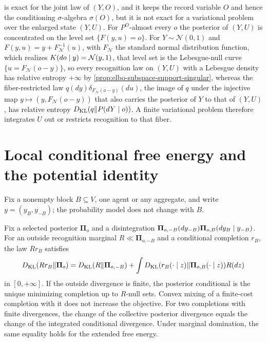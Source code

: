 is exact for the joint law of
$(Y,O)$, and it keeps the record variable $O$ and hence the conditioning
$\sigma$-algebra $\sigma(O)$, but it is not exact for a variational problem
over the enlarged state $(Y,U)$. For
$P^O$-almost every $o$ the posterior of $(Y,U)$ is concentrated on the level set
$\{F(y,u)=o\}$. For $Y\sim\mathcal N(0,1)$ and
$F(y,u)=y+F_{\mathcal N}^{-1}(u)$, with $F_{\mathcal N}$ the standard normal
distribution function, which realizes $K(do\mid y)=\mathcal N(y,1)$, that
level set is the Lebesgue-null curve $\{u=F_{\mathcal N}(o-y)\}$, so every
recognition law on $(Y,U)$ with a Lebesgue density has relative entropy
$+\infty$ by \cref{prop:elbo-subspace-support-singular}, whereas the
fiber-restricted law $q(dy)\delta_{F_{\mathcal N}(o-y)}(du)$, the image of $q$
under the injective map $y\mapsto(y,F_{\mathcal N}(o-y))$ that also carries the
posterior of $Y$ to that of $(Y,U)$, has relative entropy
$D_{\mathrm{KL}}(q\Vert P(dY\mid o))$. A finite variational problem therefore integrates
$U$ out or restricts recognition to that fiber. 

\section{Local conditional free energy and the potential identity}
\label{sec:local-conditional-vfe}

Fix a nonempty block $B\subseteq V$, one agent or any aggregate, and write
$y=(y_B,y_{-B})$; the probability model does not change with $B$.

Fix a selected posterior $\boldsymbol\Pi_o$ and a disintegration
$\boldsymbol\Pi_{o,-B}(dy_{-B})\boldsymbol\Pi_{o,B}(dy_B\mid y_{-B})$.
For an outside recognition marginal $R\ll\boldsymbol\Pi_{o,-B}$ and a
conditional completion $r_B$, the law $Rr_B$ satisfies
\begin{equation}
D_{\mathrm{KL}}(Rr_B\Vert\boldsymbol\Pi_o)
=D_{\mathrm{KL}}(R\Vert\boldsymbol\Pi_{o,-B})
+\int D_{\mathrm{KL}}(r_B(\cdot\mid z)\Vert\boldsymbol\Pi_{o,B}(\cdot\mid z))R(dz)
\label{eq:elbo-measure-block-descent}
\end{equation}
in $[0,+\infty]$. If the outside divergence is finite, the posterior
conditional is the unique minimizing completion up to $R$-null sets.
Convex mixing of a finite-cost completion with it does not increase the objective.
For two completions with finite divergences, the change of the collective
posterior divergence equals the change of the integrated conditional
divergence. Under marginal domination, the same equality holds for the
extended free energy.

